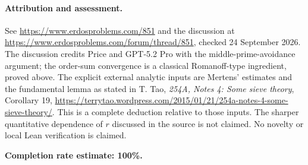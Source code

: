 \paragraph{Attribution and assessment.}
See \url{https://www.erdosproblems.com/851} and the discussion at \url{https://www.erdosproblems.com/forum/thread/851}, checked 24 September 2026. The discussion credits Price and GPT-5.2 Pro with the middle-prime-avoidance argument; the order-sum convergence is a classical Romanoff-type ingredient, proved above. The explicit external analytic inputs are Mertens' estimates and the fundamental lemma as stated in T. Tao, \emph{254A, Notes 4: Some sieve theory}, Corollary 19, \url{https://terrytao.wordpress.com/2015/01/21/254a-notes-4-some-sieve-theory/}. This is a complete deduction relative to those inputs. The sharper quantitative dependence of \(r\) discussed in the source is not claimed. No novelty or local Lean verification is claimed.

\textbf{Completion rate estimate: 100\%.}
